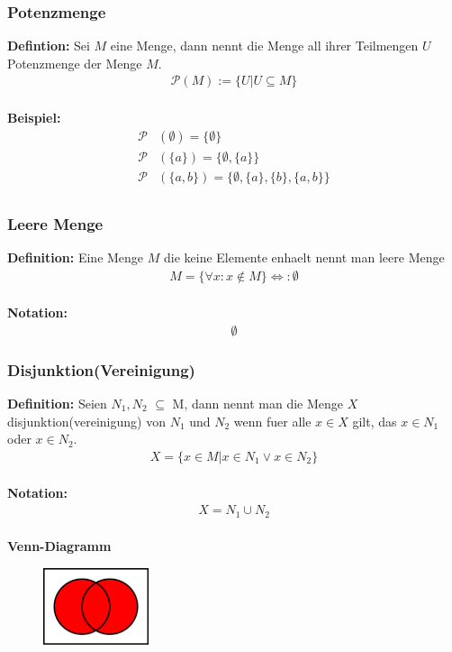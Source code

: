 \documentclass[../AbiMappe_Mathe.tex]{subfiles}
\begin{document}
\subsubsection{Potenzmenge}
\textbf{Defintion:} Sei $M$ eine Menge, dann nennt die Menge all ihrer Teilmengen $U$ Potenzmenge der Menge $M$.
\begin{align*}
\mathcal{P}(M) := \{U|U \subseteq M  \}
\end{align*}
\\\textbf{Beispiel:} 
\begin{align*}
\mathcal P&(\emptyset) = \{ \emptyset \}\\
\mathcal P&(\{ a \}) = \bigl\{ \emptyset, \{ a \} \bigr\}\\
\mathcal P&(\{ a, b \}) = \bigl\{ \emptyset, \{ a \}, \{ b \}, \{ a, b \} \bigr\}\\
\end{align*}

\subsubsection{Leere Menge}
\textbf{Definition:} Eine Menge $M$ die keine Elemente enhaelt nennt man leere Menge
\begin{align*}
M = \{\forall x:x\notin M\}  \Leftrightarrow: \emptyset
\end{align*}
\\
\textbf{Notation:}
\begin{align*}
\emptyset
\end{align*}

\subsubsection{Disjunktion(Vereinigung)}
\textbf{Definition:} Seien $N_1,N_2$ $\subseteq$ M, dann nennt man die Menge $X$ disjunktion(vereinigung) von $N_1$ und  $N_2$ wenn fuer alle $x \in X$ gilt, das $x \in N_1$ oder $x \in N_2$.
\begin{align*}
X=\{x \in M| x \in N_1 \lor x \in N_2 \}
\end{align*}
\\
\textbf{Notation:}
\begin{align*}
X=N_1 \cup N_2
\end{align*}
\\
\textbf{Venn-Diagramm}
\begin{figure}[H]
\centering
\includegraphics[width=117px, height=85.5px]{VennDis.png}
\end{figure}
\end{document}
